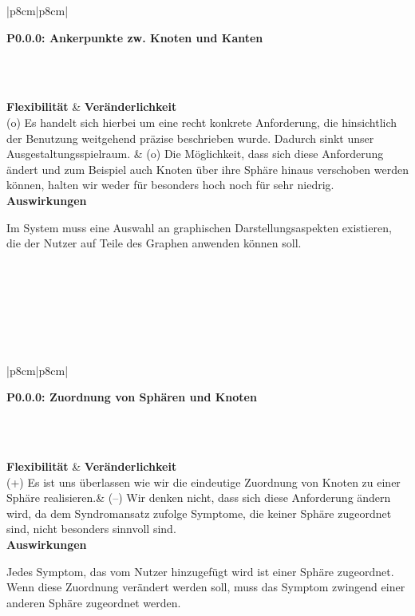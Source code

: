 \documentclass[enabledeprecatedfontcommands,fontsize=11pt,paper=a4,twoside]{scrartcl}
\newcounter{one}
\newcounter{two}[one]
\newcounter{three}[two]
\newcommand{\tone}{0\theone}
\newcommand{\ttwo}{0\thetwo}
\newcommand{\three}{\stepcounter{three}0\thethree}
\begin{document}
\begin{tabular} {|p{8cm}|p{8cm}|}
	\hline
	 {\parbox{16cm}{\textbf{\hypertarget{s}{P\tone.\ttwo.\three}: Ankerpunkte zw. Knoten und Kanten}} }\\ \hline\hline
	\rule{0pt}{8ex}\\ [6ex] \hline
	\textbf{Flexibilität}  & \textbf{Veränderlichkeit} \\
	(o) Es handelt sich hierbei um eine recht konkrete Anforderung, die hinsichtlich der Benutzung weitgehend präzise beschrieben wurde. Dadurch sinkt unser Ausgestaltungsspielraum. &
	(o) Die Möglichkeit, dass sich diese Anforderung ändert und zum Beispiel auch Knoten über ihre Sphäre hinaus verschoben werden können, halten wir weder für besonders hoch noch für sehr niedrig. \\ \hline
	 {\textbf{Auswirkungen}} \\
	 {\parbox{16cm}{Im System muss eine Auswahl an graphischen Darstellungsaspekten existieren, die der Nutzer auf Teile des Graphen anwenden können soll.}}\\ \hline
\end{tabular}
\\ \\ \\ \\%
\begin{tabular} {|p{8cm}|p{8cm}|}
	\hline
	 {\parbox{16cm}{\textbf{\hypertarget{t}{P\tone.\ttwo.\three}: Zuordnung von Sphären und Knoten}} }\\  \hline\hline 
	\rule{0pt}{6ex}\\ [3ex] \hline
	\textbf{Flexibilität}  & \textbf{Veränderlichkeit} \\
	(+) Es ist uns überlassen wie wir die eindeutige Zuordnung von Knoten zu einer Sphäre realisieren.& 
	(–) Wir denken nicht, dass sich diese Anforderung ändern wird, da dem Syndromansatz zufolge Symptome, die keiner Sphäre zugeordnet sind, nicht besonders sinnvoll sind.\\
	\hline
	 {\textbf{Auswirkungen}} \\
	 {\parbox{16cm}{Jedes Symptom, das vom Nutzer hinzugefügt wird ist einer Sphäre zugeordnet. Wenn diese Zuordnung verändert werden soll, muss das Symptom zwingend einer anderen Sphäre zugeordnet werden.} }\\ \hline
\end{tabular}
\end{document}
